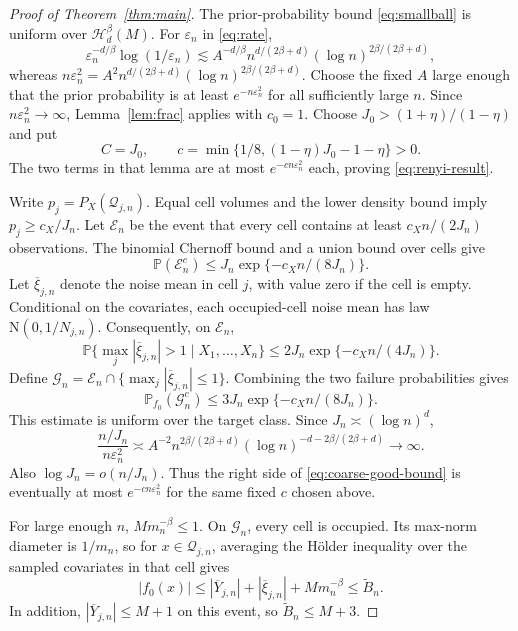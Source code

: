 \documentclass[11pt,a4paper]{article}
\theoremstyle{remark}
\newcommand{\Hcal}{\mathcal H}
\newcommand{\PP}{\mathbb P}
\begin{document}
\begingroup
\begin{proof}[Proof of Theorem~\ref{thm:main}]
The prior-probability bound \eqref{eq:smallball} is uniform over
$\Hcal_d^\beta(M)$. For $\varepsilon_n$ in \eqref{eq:rate},
\[
\varepsilon_n^{-d/\beta}\log(1/\varepsilon_n)
\lesssim A^{-d/\beta}
n^{d/(2\beta+d)}(\log n)^{2\beta/(2\beta+d)},
\]
whereas
$n\varepsilon_n^2=A^2n^{d/(2\beta+d)}
(\log n)^{2\beta/(2\beta+d)}$.
Choose the fixed $A$ large enough that the prior probability is at
least $e^{-n\varepsilon_n^2}$ for all sufficiently large $n$.
Since $n\varepsilon_n^2\to\infty$, Lemma~\ref{lem:frac} applies with
$c_0=1$. Choose $J_0>(1+\eta)/(1-\eta)$ and put
\[
C=J_0,\qquad
c=\min\{1/8,(1-\eta)J_0-1-\eta\}>0.
\]
The two terms in that lemma are at most $e^{-cn\varepsilon_n^2}$
each, proving \eqref{eq:renyi-result}.

Write $p_j=P_X(\mathcal Q_{j,n})$. Equal cell volumes and the lower
density bound imply $p_j\geq c_X/J_n$.
Let $\mathcal E_n$ be the event that every cell contains at least
$c_Xn/(2J_n)$ observations. The binomial Chernoff bound and a union
bound over cells give
\[
\PP(\mathcal E_n^c)\leq J_n\exp\{-c_Xn/(8J_n)\}.
\]
Let $\overline\xi_{j,n}$ denote the noise mean in cell $j$, with
value zero if the cell is empty. Conditional on the covariates,
each occupied-cell noise mean has law $\mathrm N(0,1/N_{j,n})$.
Consequently, on $\mathcal E_n$,
\[
\PP\{\max_j|\overline\xi_{j,n}|>1\mid X_1,\ldots,X_n\}
\leq2J_n\exp\{-c_Xn/(4J_n)\}.
\]
Define $\mathcal G_n=\mathcal E_n\cap
\{\max_j|\overline\xi_{j,n}|\leq1\}$. Combining the two failure
probabilities gives
\begin{equation}\label{eq:coarse-good-bound}
\PP_{f_0}(\mathcal G_n^c)
\leq3J_n\exp\{-c_Xn/(8J_n)\}.
\end{equation}
This estimate is uniform over the target class. Since
$J_n\asymp(\log n)^d$,
\[
\frac{n/J_n}{n\varepsilon_n^2}
\asymp A^{-2}n^{2\beta/(2\beta+d)}
(\log n)^{-d-2\beta/(2\beta+d)}\longrightarrow\infty.
\]
Also $\log J_n=o(n/J_n)$. Thus the right side of
\eqref{eq:coarse-good-bound} is eventually at most
$e^{-cn\varepsilon_n^2}$ for the same fixed $c$ chosen above.

For large enough $n$, $Mm_n^{-\beta}\leq1$.
On $\mathcal G_n$, every cell is occupied. Its max-norm diameter is
$1/m_n$, so for $x\in\mathcal Q_{j,n}$, averaging the H\"older
inequality over the sampled covariates in that cell gives
\begin{equation}\label{eq:coarse-range}
|f_0(x)|\leq|\overline Y_{j,n}|+
|\overline\xi_{j,n}|+Mm_n^{-\beta}
\leq\widetilde B_n.
\end{equation}
In addition, $|\overline Y_{j,n}|\leq M+1$ on this event, so
$\widetilde B_n\leq M+3$.


\end{proof}
\end{document}
